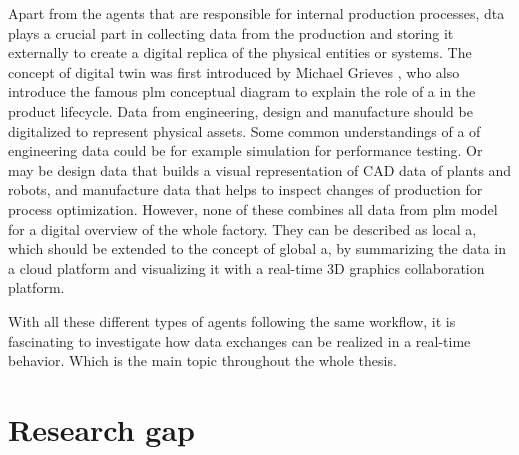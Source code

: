 Apart from the agents that are responsible for internal production 
processes, \gls{dta} plays a crucial part in collecting data from the 
production and storing it externally to create a digital replica of the 
physical entities or systems. The concept of digital twin was first introduced by Michael Grieves \cite{flumerfelt_complex_2019}, who also introduce the famous \gls{plm} conceptual diagram \cite{greengard_digital_nodate}to explain the role of a in the product lifecycle. Data from engineering, design and manufacture should be digitalized to represent physical assets. Some common understandings of a of engineering data could be for example simulation for performance testing. Or may be design data that builds a visual representation of CAD data of plants and robots, and manufacture data that helps to inspect changes of production for process optimization. However, none of these combines all data from \gls{plm} model for a digital overview of the whole factory. They can be described as local a, which should be extended to the concept of global a, by summarizing the data in a cloud platform and visualizing it with a real-time 3D graphics collaboration platform. 



With all these different types of agents following the same workflow, it is fascinating to investigate how data exchanges can be realized in a real-time behavior. Which is the main topic throughout the whole thesis.


\section{Research gap}